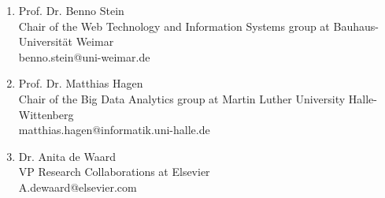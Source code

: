


\begin{enumerate}
    \item Prof. Dr. Benno Stein \\ 
    Chair of the Web Technology and Information Systems group at Bauhaus-Universität Weimar\\ 
    benno.stein@uni-weimar.de
    
    
    \item Prof. Dr. Matthias Hagen\\ 
    Chair of the Big Data Analytics group at Martin Luther University Halle-Wittenberg\\
    matthias.hagen@informatik.uni-halle.de
    
     \item Dr. Anita de Waard \\
    VP Research Collaborations at Elsevier \\
    A.dewaard@elsevier.com
    





\end{enumerate}